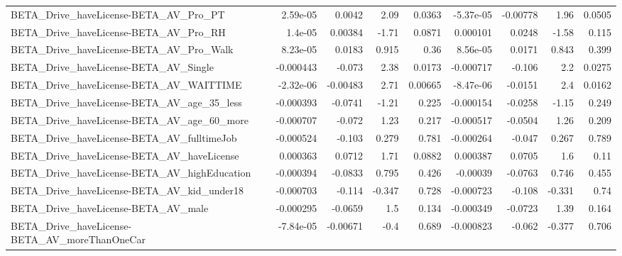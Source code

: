 \begin{tabular}{lrrrrrrrr}
BETA\_Drive\_haveLicense-BETA\_AV\_Pro\_PT              &    2.59e-05 &       0.0042 &     2.09 &   0.0363 &  -5.37e-05 &    -0.00778 &         1.96 &        0.0505 \\
BETA\_Drive\_haveLicense-BETA\_AV\_Pro\_RH              &     1.4e-05 &      0.00384 &    -1.71 &   0.0871 &   0.000101 &      0.0248 &        -1.58 &         0.115 \\
BETA\_Drive\_haveLicense-BETA\_AV\_Pro\_Walk            &    8.23e-05 &       0.0183 &    0.915 &     0.36 &   8.56e-05 &      0.0171 &        0.843 &         0.399 \\
BETA\_Drive\_haveLicense-BETA\_AV\_Single              &   -0.000443 &       -0.073 &     2.38 &   0.0173 &  -0.000717 &      -0.106 &          2.2 &        0.0275 \\
BETA\_Drive\_haveLicense-BETA\_AV\_WAITTIME            &   -2.32e-06 &     -0.00483 &     2.71 &  0.00665 &  -8.47e-06 &     -0.0151 &          2.4 &        0.0162 \\
BETA\_Drive\_haveLicense-BETA\_AV\_age\_35\_less         &   -0.000393 &      -0.0741 &    -1.21 &    0.225 &  -0.000154 &     -0.0258 &        -1.15 &         0.249 \\
BETA\_Drive\_haveLicense-BETA\_AV\_age\_60\_more         &   -0.000707 &       -0.072 &     1.23 &    0.217 &  -0.000517 &     -0.0504 &         1.26 &         0.209 \\
BETA\_Drive\_haveLicense-BETA\_AV\_fulltimeJob         &   -0.000524 &       -0.103 &    0.279 &    0.781 &  -0.000264 &      -0.047 &        0.267 &         0.789 \\
BETA\_Drive\_haveLicense-BETA\_AV\_haveLicense         &    0.000363 &       0.0712 &     1.71 &   0.0882 &   0.000387 &      0.0705 &          1.6 &          0.11 \\
BETA\_Drive\_haveLicense-BETA\_AV\_highEducation       &   -0.000394 &      -0.0833 &    0.795 &    0.426 &   -0.00039 &     -0.0763 &        0.746 &         0.455 \\
BETA\_Drive\_haveLicense-BETA\_AV\_kid\_under18         &   -0.000703 &       -0.114 &   -0.347 &    0.728 &  -0.000723 &      -0.108 &       -0.331 &          0.74 \\
BETA\_Drive\_haveLicense-BETA\_AV\_male                &   -0.000295 &      -0.0659 &      1.5 &    0.134 &  -0.000349 &     -0.0723 &         1.39 &         0.164 \\
BETA\_Drive\_haveLicense-BETA\_AV\_moreThanOneCar      &   -7.84e-05 &     -0.00671 &     -0.4 &    0.689 &  -0.000823 &      -0.062 &       -0.377 &         0.706 \\

\end{tabular}
